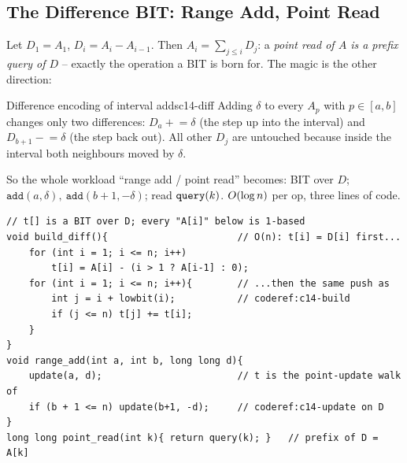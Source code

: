 \subsection{The Difference BIT: Range Add, Point Read}

Let \(D_1=A_1\), \(D_i=A_i-A_{i-1}\).  Then \(A_i=\sum_{j\le i}D_j\): a
\emph{point read of \(A\) is a prefix query of \(D\)} -- exactly the
operation a BIT is born for.  The magic is the other direction:

\begin{definition}{Difference encoding of interval adds}{c14-diff}
Adding \(\delta\) to every \(A_p\) with \(p\in[a,b]\) changes only two
differences: \(D_a\mathrel{+}=\delta\) (the step up into the interval) and
\(D_{b+1}\mathrel{-}=\delta\) (the step back out).  All other \(D_j\) are
untouched because inside the interval both neighbours moved by \(\delta\).
\end{definition}

So the whole workload ``range add / point read'' becomes: BIT over \(D\);
\(\texttt{add}(a,\delta),\ \texttt{add}(b{+}1,-\delta)\); read
\(\texttt{query}(k)\).  \(O(\log n)\) per op, three lines of code.

\begin{lstlisting}[caption={the difference BIT: build from A by differencing (O(n)), range add as two point updates}, label={lst:c14-diff-build}]
// t[] is a BIT over D; every "A[i]" below is 1-based
void build_diff(){                       // O(n): t[i] = D[i] first...
    for (int i = 1; i <= n; i++)
        t[i] = A[i] - (i > 1 ? A[i-1] : 0);
    for (int i = 1; i <= n; i++){        // ...then the same push as
        int j = i + lowbit(i);           // coderef:c14-build
        if (j <= n) t[j] += t[i];
    }
}
void range_add(int a, int b, long long d){
    update(a, d);                        // t is the point-update walk of
    if (b + 1 <= n) update(b+1, -d);     // coderef:c14-update on D
}
long long point_read(int k){ return query(k); }   // prefix of D = A[k]
\end{lstlisting}

